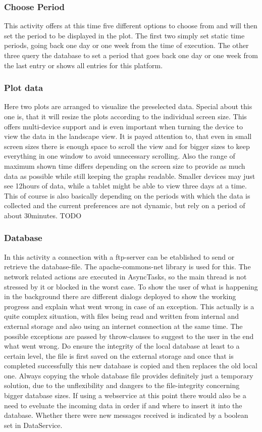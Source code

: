 \documentclass[11pt,oneside,a4paper]{scrartcl}
\begin{document}
\subsubsection{Choose Period}
This activity offers at this time five different options to choose from and will then set the period to be displayed in the plot. The first two simply set static time periods, going back one day or one week from the time of execution.
The other three query the database to set a period that goes back one day or one week from the last entry or shows all entries for this platform.

\subsubsection{Plot data}
Here two plots are arranged to visualize the preselected data. Special about this one is, that it will resize the plots according to the individual screen size. This offers multi-device support and is even important when turning the device to view the data in the landscape view. It is payed attention to, that even in small screen sizes there is enough space to scroll the view and for bigger sizes to keep everything in one window to avoid unnecessary scrolling. Also the range of maximum shown time differs depending on the screen size to provide as much data as possible while still keeping the graphs readable. Smaller devices may just see 12hours of data, while a tablet might be able to view three days at a time.
This of course is also basically depending on the periods with which the data is collected and the current preferences are not dynamic, but rely on a period of about 30minutes. TODO

\subsubsection{Database}
In this activity a connection with a ftp-server can be etablished to send or retrieve the database-file. The apache-commons-net library is used for this. The network related actions are executed in AsyncTasks, so the main thread is not stressed by it or blocked in the worst case. To show the user of what is happening in the background there are different dialogs deployed to show the working progress and explain what went wrong in case of an exception. This actually is a quite complex situation, with files being read and written from internal and external storage and also using an internet connection at the same time. The possible exceptions are passed by throw-clauses to suggest to the user in the end what went wrong.
Do ensure the integrity of the local database at least to a certain level, the file is first saved on the external storage and once that is completed successfully this new database is copied and then 
replaces the old local one. Always copying the whole database file provides definitely just a temporary solution, due to the unflexibility and dangers to the file-integrity concerning bigger database sizes.
If using a webservice at this point there would also be a need to eveluate the incoming data in order if and where to insert it into the database. Whether there were new messages received is indicated by a boolean set in DataService.
\end{document}
